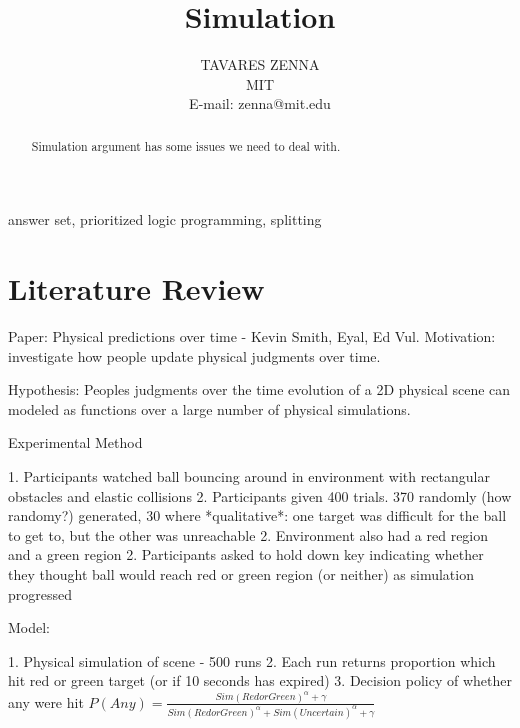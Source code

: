 \documentclass{tlp}
\begin{document}


\long{}

\title{Simulation}

\author[Z. Tavares]
{TAVARES ZENNA \\
MIT\\
E-mail: zenna@mit.edu
}

\pagerange{\pageref{firstpage}--\pageref{lastpage}}
\setcounter{page}{1}

\maketitle

\label{firstpage}

\begin{abstract}
%
Simulation argument has some issues we need to deal with.

\end{abstract}
\begin{keywords}
 answer set, prioritized logic programming, splitting
\end{keywords}


\section{Literature Review}
Paper: Physical predictions over time - Kevin Smith, Eyal, Ed Vul.
Motivation: investigate how people update physical judgments over time.

Hypothesis: Peoples judgments over the time evolution of a 2D physical scene can modeled as functions over a large number of physical simulations.

Experimental Method

1. Participants watched ball bouncing around in environment with rectangular obstacles and elastic collisions
2. Participants given 400 trials. 370 randomly (how randomy?) generated, 30 where *qualitative*: one target was difficult for the ball to get to, but the other was unreachable
2. Environment also had a red region and a green region 
2. Participants asked to hold down key indicating whether they thought ball would reach red or green region (or neither) as simulation progressed

Model:

1. Physical simulation of scene - 500 runs
2. Each run returns proportion which hit red or green target (or if 10 seconds has expired)
3. Decision policy of whether any were hit $P(Any) = \frac{Sim(Red or Green)^\alpha + \gamma}{Sim(Red or Green)^\alpha + Sim(Uncertain)^\alpha + \gamma}$
\end{document}
